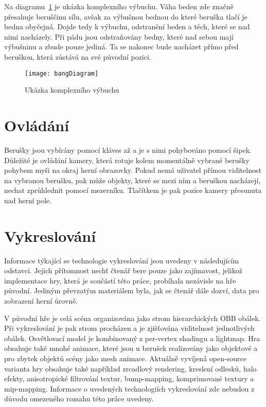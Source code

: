 Na diagramu~\ref{fig:bangDiagram} je ukázka komplexního výbuchu. Váha beden zde značně přesahuje beruščinu sílu, avšak za výbušnou bednou do které beruška tlačí je bedna obyčejná. Dojde tedy k výbuchu, odstranění beden a  těch, které se nad nimi nacházely. Při pádu jsou odstraňovány bedny, které nad sebou mají výbušninu a zbude pouze jediná. Ta se nakonec bude nacházet přímo před beruškou, která zůstává na své původní pozici.

\begin{figure}[htb]
\centering
\texttt{[image: bangDiagram]}
\caption{Ukázka komplexního výbuchu}
\label{fig:bangDiagram}
\end{figure}

\section{Ovládání}
Berušky jsou vybírány pomocí kláves  až  a je s nimi pohybováno pomocí šipek. Důležité je ovládání kamery, která rotuje kolem momentálně vybrané berušky pohybem myši na okraj herní obrazovky. Pokud nemá uživatel přímou viditelnost na vybranou berušku, pak může objekty, které se mezi ním a beruškou nacházejí, nechat zprůhlednit pomocí mezerníku. Tlačítkem \Enter je pak pozice kamery přesunuta nad herní pole. 

\section{Vykreslování}
\label{section:navrhVykreslovani}
Informace týkající se technologie vykreslování jsou uvedeny v následujícím odstavci. Jejich přítomnost nechť čtenář bere pouze jako zajímavost, jelikož implementace hry, která je součástí této práce, probíhala nezávisle na hře původní. Jediným převzatým materiálem byla, jak se čtenář dále dozví, data pro zobrazení herní úrovně. 

V původní hře je celá scéna organizována jako strom hierarchických OBB obálek. Při vykreslování je pak strom procházen a je zjišťována viditelnost jednotlivých obálek. Osvětlovací model je kombinovaný z per-vertex shadingu a lightmap. Hra obsahuje také mnohé animace, které jsou u berušek realizovány jako objektové a pro zbytek objektů scény jako mesh animace. Aktuálně vyvíjená open-source varianta hry obsahuje také například zrcadlový rendering, kreslení odlesků, halo efekty, anisotropické filtrování textur, bump-mapping, komprimované textury a mip-mapping. Informace o uvedených technologiích vykreslování zde nebudou z důvodu omezeného rozsahu této práce uvedeny.

